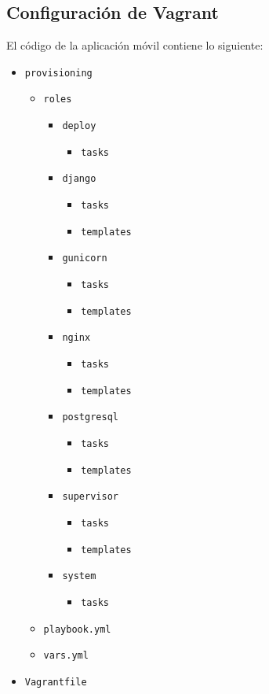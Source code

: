 \subsection{Configuración de Vagrant}


El código de la aplicación móvil contiene lo siguiente:

\begin{itemize}
\item \texttt{provisioning}
  \begin{itemize}
  \item \texttt{roles}
    \begin{itemize}
    \item \texttt{deploy}
      \begin{itemize}
      \item \texttt{tasks}
      \end{itemize}
    \item \texttt{django}
      \begin{itemize}
      \item \texttt{tasks}
      \item \texttt{templates}
      \end{itemize}
    \item \texttt{gunicorn}
      \begin{itemize}
      \item \texttt{tasks}
      \item \texttt{templates}
      \end{itemize}
    \item \texttt{nginx}
      \begin{itemize}
      \item \texttt{tasks}
      \item \texttt{templates}
      \end{itemize}
    \item \texttt{postgresql}
      \begin{itemize}
      \item \texttt{tasks}
      \item \texttt{templates}
      \end{itemize}
    \item \texttt{supervisor}
      \begin{itemize}
      \item \texttt{tasks}
      \item \texttt{templates}
      \end{itemize}
    \item \texttt{system}
      \begin{itemize}
      \item \texttt{tasks}
      \end{itemize}
    \end{itemize}
  \item \texttt{playbook.yml}
  \item \texttt{vars.yml}
  \end{itemize}
\item \texttt{Vagrantfile}
\end{itemize}


